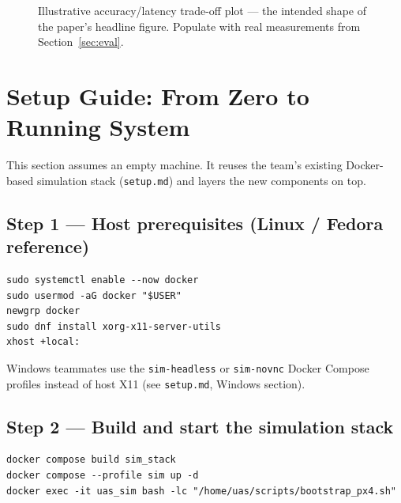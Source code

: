 \documentclass[11pt,a4paper]{article}
\newcommand{\code}[1]{\texttt{\small #1}}
\begin{document}
\begin{figure}[h!]
\centering
{}
\caption{Illustrative accuracy/latency trade-off plot --- the intended shape of the paper's headline figure. Populate with real measurements from Section~\ref{sec:eval}.}
\label{fig:tradeoff}
\end{figure}

\section{Setup Guide: From Zero to Running System}

This section assumes an empty machine. It reuses the team's existing Docker-based simulation stack (\code{setup.md}) and layers the new components on top.

\subsection{Step 1 --- Host prerequisites (Linux / Fedora reference)}
\begin{verbatim}
sudo systemctl enable --now docker
sudo usermod -aG docker "$USER"
newgrp docker
sudo dnf install xorg-x11-server-utils
xhost +local:
\end{verbatim}
Windows teammates use the \code{sim-headless} or \code{sim-novnc} Docker Compose profiles instead of host X11 (see \code{setup.md}, Windows section).

\subsection{Step 2 --- Build and start the simulation stack}
\begin{verbatim}
docker compose build sim_stack
docker compose --profile sim up -d
docker exec -it uas_sim bash -lc "/home/uas/scripts/bootstrap_px4.sh"
\end{verbatim}
\end{document}
